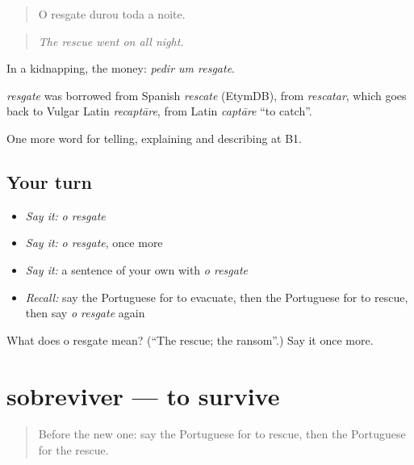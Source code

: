 \begin{quote}
O resgate durou toda a noite.
\end{quote}

\begin{quote}
\emph{The rescue went on all night.}
\end{quote}

In a kidnapping, the money: \emph{pedir um resgate}.

\begin{cousinweb}
\emph{resgate} was borrowed from Spanish \emph{rescate} (EtymDB), from \emph{rescatar}, which goes back to Vulgar Latin \emph{recaptāre}, from Latin \emph{captāre} \textquotedblleft{}to catch\textquotedblright{}.
\end{cousinweb}

\begin{grammarlens}[title={What you've built}]
One more word for telling, explaining and describing at B1.
\end{grammarlens}

\subsection*{Your turn}
\begin{itemize}
\raggedright
  \item \emph{Say it:} \emph{o resgate}
  \item \emph{Say it:} \emph{o resgate}, once more
  \item \emph{Say it:} a sentence of your own with \emph{o resgate}
  \item \emph{Recall:} say the Portuguese for to evacuate, then the Portuguese for to rescue, then say \emph{o resgate} again
\end{itemize}

\begin{tcolorbox}[breakable,colback=teal!4,colframe=teal!35!black,title={Before you move on}]
What does o resgate mean? (\textquotedblleft{}The rescue; the ransom\textquotedblright{}.) Say it once more.
\end{tcolorbox}
\section[sobreviver]{sobreviver — to survive}

\label{lesson:PT-C306-sobreviver}



\begin{quote}
Before the new one: say the Portuguese for to rescue, then the Portuguese for the rescue.
\end{quote}

